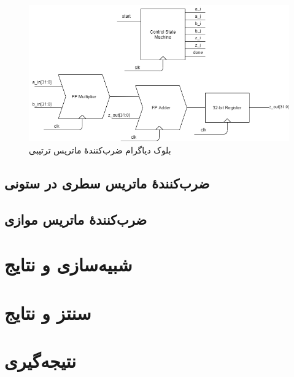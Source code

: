 \documentclass[conference]{IEEEtran-ModifiedForMVIP}
\begin{document}
\begin{figure}[t]
\centering 
% 
\includegraphics[width=1\linewidth]{Images/SequentialBD.png}
\caption{
\centering
بلوک دیاگرام ضرب‌کنندهٔ ماتریس ترتیبی
}\label{fig:SequentialBD}
\end{figure}

\subsection{
    ضرب‌کنندهٔ ماتریس سطری در ستونی
}

\subsection{
    ضرب‌کنندهٔ ماتریس موازی
}

\section{شبیه‌سازی و نتایج}

\section{سنتز و نتایج}

\section{نتیجه‌گیری}
\end{document}
